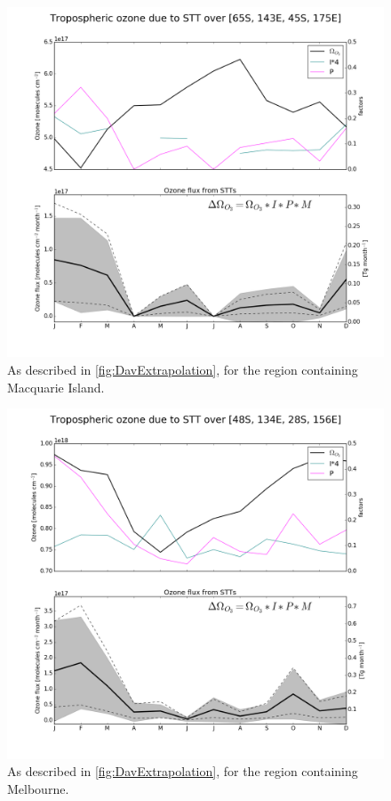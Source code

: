 \documentclass[acp, manuscript]{copernicus} %
\begin{document}
    \begin{figure}
      \includegraphics[width=12.0cm]{figures/STT_extrapolation_Mac.png}
      \caption{%
	As described in \ref{fig:DavExtrapolation}, for the region containing Macquarie Island.}
      \label{fig:MacExtrapolation}
    \end{figure}

    \begin{figure}
      \includegraphics[width=12.0cm]{figures/STT_extrapolation_Melb.png}
      \caption{%
	As described in \ref{fig:DavExtrapolation}, for the region containing Melbourne.}
      \label{fig:MelbExtrapolation}
    \end{figure}
    
\end{document}

